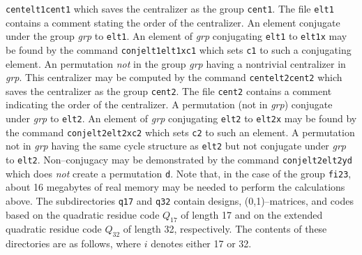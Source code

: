 {   \smallskip
   \hskip0.4in{\tt cent\quad elt1\quad cent1}
   \smallskip
          which saves the centralizer as the group {\tt cent1}.
          The file {\tt elt1} contains a comment stating the order of the
          centralizer.
   \medbreak
   \noindent{}An element conjugate
                 under the group {\it grp\/}
                 to {\tt elt1}.  An element of {\it grp\/} conjugating {\tt elt1}
                 to {\tt elt1x} may be found by the command
   \smallskip
   \hskip0.4in{\tt conj\quad elt1\quad elt1x\quad c1}
   \smallskip
          which sets {\tt c1} to such a conjugating element.
   \medbreak
   \noindent{}An permutation {\it not\/}
                 in the group {\it grp\/} having a nontrivial
                 centralizer in {\it grp}.  This centralizer may be
                 computed by the command
   \smallskip
   \hskip0.4in{\tt cent\quad elt2\quad cent2}
   \smallskip
          which saves the centralizer as the group {\tt cent2}.
          The file {\tt cent2} contains a comment indicating the order of the
          centralizer.
   \medbreak
   \noindent{}A permutation (not in {\it grp\/})
                 conjugate under {\it grp\/}
                 to {\tt elt2}.  An element of {\it grp\/} conjugating {\tt elt2}
                 to {\tt elt2x} may be found by the command
   \smallskip
   \hskip0.4in{\tt conj\quad elt2\quad elt2x\quad c2}
   \smallskip
          which sets {\tt c2} to such an element.
   \medbreak
   \noindent{}A permutation not in {\it grp\/}
                 having the same cycle structure as {\tt elt2} but not
                 conjugate under {\it grp\/} to {\tt elt2}.  Non--conjugacy may
                 be demonstrated by the command
   \smallskip
   \hskip0.4in{\tt conj\quad elt2\quad elt2y\quad d}
   \smallskip
          which does {\it not} create a permutation {\tt d}.
\vskip0pt}
\medbreak
Note that, in the case of the group {\tt fi23}, about 16 megabytes of real
memory may be needed to perform the calculations above.
\bigbreak
The subdirectories {\tt q17} and {\tt q32} contain designs, (0,1)--matrices,
and codes based on the quadratic residue code $Q_{17}$ of length 17 and
on the extended quadratic residue code $Q_{32}$ of length 32, respectively.
The contents of these directories are as follows, where $i$ denotes either
17 or 32.
\medbreak
